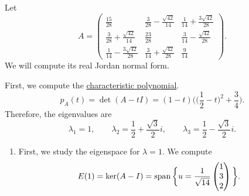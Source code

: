 	\begin{example}
	  \label{ex:real-jordan-normal-form-of-a-3times3-matrix}
		Let
		\begin{equation}
			A =
			\begin{pmatrix}
				\frac{15}{28} & \frac{3}{28} - \frac{\sqrt{42}}{14} & \frac{1}{14} + \frac{3\sqrt{42}}{28} \\
				\frac{3}{28} + \frac{\sqrt{42}}{14} & \frac{23}{28} & \frac{3}{14} - \frac{\sqrt{42}}{28} \\
				\frac{1}{14} - \frac{3\sqrt{42}}{28} & \frac{3}{14} + \frac{\sqrt{42}}{28} & \frac{9}{14}
			\end{pmatrix}.
		\end{equation}
		We will compute its real Jordan normal form.

		First, we compute the \hyperref[def:characteristic-polynomial]{characteristic polynomial}.
		\begin{equation}
			p_A(t) = \det(A - tI)
			= (1 - t)\bigg(\bigg(\frac{1}{2} - t\bigg)^2 + \frac{3}{4}\bigg).
		\end{equation}
		Therefore, the eigenvalues are
		\begin{equation}
			\lambda_1 = 1, \qquad
			\lambda_2 = \frac{1}{2} + \frac{\sqrt{3}}{2}i, \qquad
			\lambda_3 = \frac{1}{2} - \frac{\sqrt{3}}{2}i.
		\end{equation}

		\begin{enumerate}
			\item First, we study the eigenspace for $\lambda = 1$. We compute
				\begin{equation}
					E(1) = \ker(A - I)
					=
					\operatorname{span} \bigg\{
					u =
					\frac{1}{\sqrt{14}}
					\begin{pmatrix}
						1 \\
						3 \\
						2
					\end{pmatrix}
					\bigg\}.
				\end{equation}


\end{enumerate}
\end{example}
